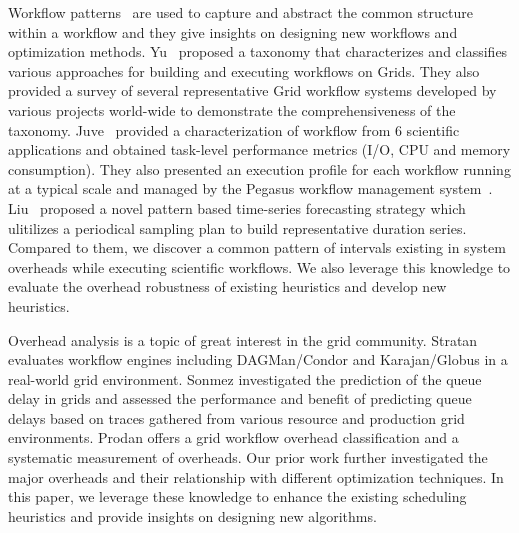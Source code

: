 \documentclass[final]{IEEEtran}
\begin{document}
Workflow patterns~\cite{Yu2005, Juve2013, Liu2008} are used to capture and abstract the common structure within a workflow and they give insights on designing new workflows and optimization methods.  
Yu~\cite{Yu2005} proposed a taxonomy that characterizes and classifies various approaches for building and executing workflows on Grids. They also provided a survey of several representative Grid workflow systems developed by various projects world-wide to demonstrate the comprehensiveness of the taxonomy. Juve~\cite{Juve2013} provided a characterization of workflow from 6 scientific applications and obtained task-level performance metrics (I/O, CPU and memory consumption). They also presented an execution profile for each workflow running at a typical scale and managed by the Pegasus workflow management system~\cite{Deelman2005}. Liu~\cite{Liu2008} proposed a novel pattern 
based time-series forecasting strategy which ulitilizes a 
periodical sampling plan to build representative 
duration series. Compared to them, we discover a common pattern of intervals existing in system overheads while executing scientific workflows. We also leverage this knowledge to evaluate the overhead robustness of existing heuristics and develop new heuristics. 

Overhead analysis \cite{Prodan2008b}\cite{Chen} is a topic of great interest in the grid community. Stratan \cite{Stratan} evaluates workflow engines including DAGMan/Condor and Karajan/Globus in a real-world grid environment. Sonmez \cite{Sonmez} investigated the prediction of the queue delay in grids and assessed the performance and benefit of predicting queue delays based on traces gathered from various resource and production grid environments. Prodan \cite{Prodan2008b} offers a grid workflow overhead classification and a systematic measurement of overheads. Our prior work \cite{Chen} further investigated the major overheads and their relationship with different optimization techniques. In this paper, we leverage these knowledge to enhance the existing scheduling heuristics and provide insights on designing new algorithms. 


\end{document}
